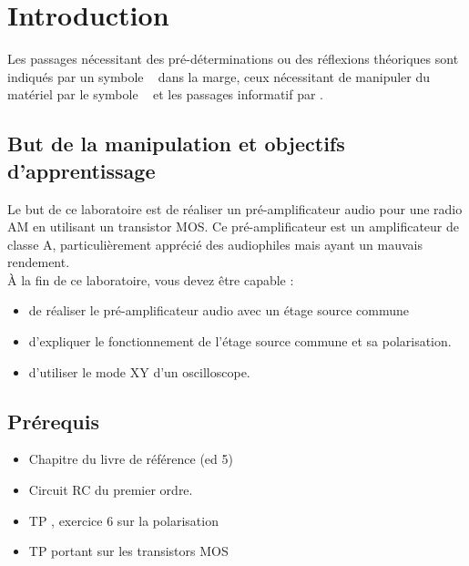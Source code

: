 \documentclass{../template/labo}
\author{The Fantastic Four} %
\begin{document}




\section{Introduction}

Les passages nécessitant des pré-déterminations ou des réflexions théoriques sont indiqués par un symbole \faCogs~ dans la marge,
ceux nécessitant de manipuler du matériel par le symbole \faFlask~ et les passages informatif par \faLightbulbO.

\subsection{But de la manipulation et objectifs d'apprentissage}

Le but de ce laboratoire est de réaliser un pré-amplificateur audio pour une radio AM en utilisant un transistor MOS.
Ce pré-amplificateur est un amplificateur de classe A, particulièrement apprécié des audiophiles mais ayant un mauvais rendement.\\


À la fin de ce laboratoire, vous devez être capable :
\begin{itemize}
\item de réaliser le pré-amplificateur audio avec un étage source commune
\item d'expliquer le fonctionnement de l'étage source commune et sa polarisation.
\item d'utiliser le mode XY d'un oscilloscope.
\end{itemize}

\subsection{Prérequis}
\begin{itemize}
\item Chapitre  du livre de référence (ed 5)
\item Circuit RC du premier ordre.
\item TP , exercice 6 sur la polarisation
\item TP  portant sur les transistors MOS

\end{itemize}
\end{document}
